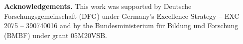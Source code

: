 \documentclass[11pt]{article}
\begin{document}
\noindent
\textbf{Acknowledgements.}
This work was supported by Deutsche Forschungsgemeinschaft (DFG) under Germany’s Excellence Strategy -- EXC 2075 -- 390740016 and by the Bundesministerium für Bildung und Forschung (BMBF) under grant 05M20VSB.

\vspace{1em}

%
%
%
\end{document}
